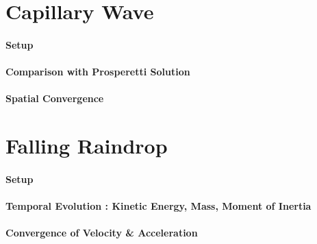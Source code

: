 
\section{Capillary Wave}

\paragraph{Setup}
\blindtext

\paragraph{Comparison with Prosperetti Solution}
\blindtext

\paragraph{Spatial Convergence}
\blindtext


\section{Falling Raindrop}

\paragraph{Setup}
\blindtext

\paragraph{Temporal Evolution : Kinetic Energy, Mass, Moment of Inertia}
\blindtext

\paragraph{Convergence of Velocity \& Acceleration}
\blindtext



